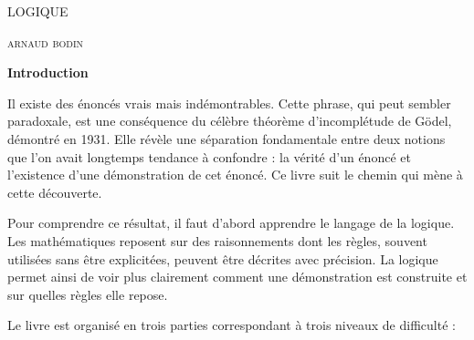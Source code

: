 
\pagestyle{empty}\thispagestyle{empty}
\vspace*{\fill}
\vspace*{5ex}
\begin{center}
	\fontsize{36}{36}\selectfont
	\textsc{LOGIQUE}
	
	
	\vspace*{2ex}
	
	\fontsize{32}{32}\selectfont
	\Large
	\textsc{arnaud bodin}

\end{center}
\vfill
\begin{center}
\end{center}

\clearemptydoublepage

\thispagestyle{empty}


\vspace*{\fill}

{\large\textbf{Introduction}}

\medskip

\og{}Il existe des énoncés vrais mais indémontrables.\fg{} Cette phrase, qui peut sembler paradoxale, est une conséquence du célèbre théorème d'incomplétude de Gödel, démontré en 1931. Elle révèle une séparation fondamentale entre deux notions que l'on avait longtemps tendance à confondre : la vérité d'un énoncé et l'existence d'une démonstration de cet énoncé. Ce livre suit le chemin qui mène à cette découverte.

Pour comprendre ce résultat, il faut d'abord apprendre le langage de la logique. Les mathématiques reposent sur des raisonnements dont les règles, souvent utilisées sans être explicitées, peuvent être décrites avec précision. La logique permet ainsi de voir plus clairement comment une démonstration est construite et sur quelles règles elle repose.

Le livre est organisé en trois parties correspondant à trois niveaux de difficulté :

